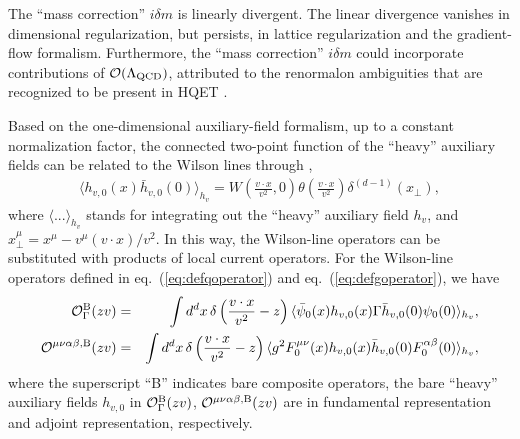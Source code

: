The ``mass correction” $i\delta m$ is linearly divergent. The linear divergence vanishes in dimensional regularization, but persists, in lattice regularization and the gradient-flow formalism. Furthermore, the ``mass correction” $i\delta m$ could incorporate contributions of $\mathcal{O}(\Lambda_{\rm QCD})$, attributed to the renormalon ambiguities that are recognized to be present in HQET \cite{Bigi:1994em, Beneke:1994sw}. 

Based on the one-dimensional auxiliary-field formalism, up to a constant normalization factor, the connected two-point function of the ``heavy” auxiliary fields can be related to the Wilson lines through \cite{Dorn:1986dt,Braun:2020ymy,Ji:2020ect},
\begin{eqnarray}
\langle h_{v,0}(x)\bar{h}_{v,0}(0) \rangle_{h_v} = W\left(\frac{v\cdot x}{v^2}, 0\right)\theta\left(\frac{v\cdot x}{v^2}\right)\delta^{(d-1)}(x_\perp),
\end{eqnarray}
where $\langle ... \rangle_{h_v}$ stands for integrating out the ``heavy” auxiliary field $h_v$,  and $x_{\perp}^{\mu} = x^{\mu} - v^{\mu}(v\cdot x)/v^2$.
In this way,  the Wilson-line operators can be substituted with products of local current operators. For the Wilson-line operators defined in eq.~(\ref{eq:defqoperator}) and eq.~(\ref{eq:defgoperator}), we have
\begin{eqnarray}
\mathcal{O}^{\rm B}_{\Gamma}(zv)  &=& \int d^d x\, \delta\left(\frac{v\cdot x}{v^2} -z\right)\langle \bar{\psi}_{0}(x)h_{v,0}(x) \Gamma \bar{h}_{v,0}(0)\psi_0(0)\rangle_{h_v},\\
\mathcal{O}^{\mu\nu\alpha\beta, \rm B}(zv)  &=& \int d^d x\, \delta\left(\frac{v\cdot x}{v^2} -z\right)\langle g^2F_{0}^{\mu\nu}(x)h_{v,0}(x)  \bar{h}_{v,0}(0)F_{0}^{\alpha\beta}(0)\rangle_{h_v},
\end{eqnarray}
where the superscript ``B” indicates bare composite operators, the bare ``heavy” auxiliary fields $h_{v,0}$ in $\mathcal{O}^{\rm B}_{\Gamma}(zv) $, $\mathcal{O}^{\mu\nu\alpha\beta, \rm B}(zv)$ are in fundamental representation and adjoint representation, respectively. 



